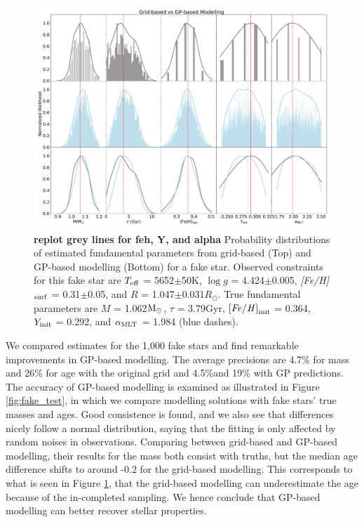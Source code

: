 \begin{figure}
	\includegraphics[width=1.9\columnwidth]{gp_fitting.pdf}
    \caption{{\bf replot grey lines for feh, Y, and alpha} Probability distributions of estimated fundamental parameters from grid-based (Top) and GP-based modelling (Bottom) for a fake star. Observed constraints for this fake star are $T_{\rm eff}$ = 5652$\pm$50K, $\log g$ = 4.424$\pm$0.005, {\it [Fe/H]}$_{\rm surf}$ =  0.31$\pm$0.05, and $R$ =  1.047$\pm$0.031$R_{\odot}$. True fundamental parameters are $M$ = 1.062$\rm M_{\odot}$, $\tau$ = 3.79Gyr, $\rm {\it [Fe/H]}_{init}$ = 0.364, $Y_{\rm init}$ = 0.292, and $\alpha_{\rm MLT}$ = 1.984 (blue dashes).} 
  \label{fig:fit_comparison}
\end{figure}

We compared estimates for the 1,000 fake stars and find remarkable improvements in GP-based modelling. 
The average precisions are 4.7\% for mass and 26\% for age with the original grid and 4.5\%and 19\% with GP predictions. 
%
The accuracy of GP-based modelling is examined as illustrated in Figure \ref{fig:fake_test}, in which we compare modelling solutions with fake stars'  true masses and ages.
Good consistence is found, and we also see that differences nicely follow a normal distribution, saying that the fitting is only affected by random noises in observations. 
%
Comparing between grid-based and GP-based modelling, their results for the mass both consist with truths, but the median age difference shifts to around -0.2 for the grid-based modelling. This corresponds to what is seen in Figure \ref{fig:fit_comparison}, that the grid-based modelling can underestimate the age because of the in-completed sampling. We hence conclude that GP-based modelling can better recover stellar properties.

